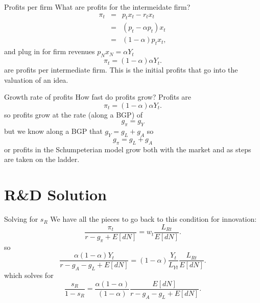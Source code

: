 \begin{frame}{Profits per firm}
What are profits for the intermeidate firm?
\begin{eqnarray}
	\pi_t &=& p_t x_t - r_t x_t \nonumber \\
	      &=& (p_t - \alpha p_t) x_t \nonumber \\
	      &=& (1-\alpha) p_t x_t, \nonumber
\end{eqnarray}
and plug in for firm revenues $p_N x_N = \alpha Y_t$
\begin{equation}
	\pi_t = (1-\alpha) \alpha Y_t.\label{EQ_pi_j}
\end{equation}
are profits per intermediate firm. This is the initial profits that go into the valuation of an idea.
\end{frame}

\begin{frame}{Growth rate of profits}
How fast do profits grow? Profits are
\begin{equation}
	\pi_t = (1-\alpha) \alpha Y_t.
\end{equation}
so profits grow at the rate (along a BGP) of
\begin{equation}
	g_{\pi} = g_Y \nonumber
\end{equation}
but we know along a BGP that $g_Y = g_L + g_A$ so
\begin{equation}
	g_{\pi} = g_L + g_A
\end{equation}
or profits in the Schumpeterian model grow both with the market and as steps are taken on the ladder.
\end{frame}

\section{R\&D Solution}
\begin{frame}{Solving for $s_R$}
We have all the pieces to go back to this condition for innovation:
\begin{equation}
	\frac{\pi_t}{r-g_{\pi}+E[dN]} = w_t \frac{L_{Rt}}{E[dN]}. \nonumber
\end{equation}
so 
\begin{equation}
	\frac{\alpha(1-\alpha) Y_t}{r-g_A-g_L+E[dN]} = (1-\alpha) \frac{Y_t}{L_{Yt}} \frac{L_{Rt}}{E[dN]}. \nonumber
\end{equation}
which solves for
\begin{equation}
	\frac{s_R}{1-s_R} = \frac{\alpha(1-\alpha)}{(1-\alpha)}\frac{E[dN]}{r-g_A-g_L+E[dN]}. \nonumber
\end{equation}

\end{frame}


